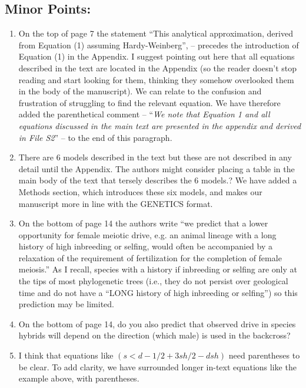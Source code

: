 \documentclass[12pt,letterpaper]{article}
\newcommand{\yb}[1]{{ \color{blue} #1}}
\begin{document}
\subsection*{Minor Points:}
\begin{enumerate}
\item   On the top of page 7 the statement ``This analytical approximation, derived
from Equation (1) assuming Hardy-Weinberg'', -- precedes the introduction of
Equation (1) in the Appendix.  I suggest pointing out here that all equations
described in the text are located in the Appendix (so the reader doesn't stop
reading and start looking for them, thinking they somehow overlooked them in the
body of the manuscript).
\yb{We can relate to the confusion and frustration of struggling to find the relevant equation. We have therefore added the parenthetical comment --   ``\emph{We note that Equation 1 and all equations discussed in the main text are presented in the appendix and derived in File S2}'' -- to the end of this paragraph.}


\item There are 6 models described in the text but these are not described in any
detail until the Appendix.  The authors might consider placing a table in the
main body of the text that tersely describes the 6 models.?
\yb{We have added a Methods section, which introduces these six models, and makes our manuscript more in line with the GENETICS format.}

\item On the bottom of page 14 the authors write ``we predict that a lower
opportunity for female meiotic drive, e.g. an animal lineage with a long history
of high inbreeding or selfing, would often be accompanied by a relaxation of the
requirement of fertilization for the completion of female meiosis.''  As I
recall, species with a history if inbreeding or selfing are only at the tips of
most phylogenetic trees (i.e., they do not persist over geological time and do
not have a ``LONG history of high inbreeding or selfing'') so this prediction may
be limited. 

\item On the bottom of page 14, do you also predict that observed drive in species
hybrids will depend on the direction (which male) is used in the backcross?

\item I think that equations like $(s < d -1/2 + 3sh/2 - dsh)$ need parentheses to be
clear. 
\yb{To add clarity, we have surrounded longer in-text equations like the example above, with parentheses.}

\end{enumerate}
\end{document}

